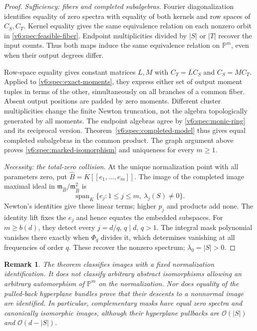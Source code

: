 \documentclass[10pt,fleqn]{article}
\numberwithin{equation}{section}
\newtheorem{remark}[theorem]{Remark}
\newcommand{\PP}{\mathbb P}
\newcommand{\Span}{\operatorname{span}}
\begin{document}
\begin{proof}
\emph{Sufficiency: fibers and completed subalgebras.}
Fourier diagonalization identifies equality of zero spectra with equality
of both kernels and row spaces of $C_S,C_T$.  Kernel equality gives
the same equivalence relation on each nonzero orbit in
\eqref{v6:spec:feasible-fiber}.  Endpoint multiplicities divided by $|S|$ or $|T|$ recover the input
counts.  Thus both maps induce the same equivalence relation on
$\PP^m$, even when their output degrees differ.

Row-space equality gives constant matrices $L,M$ with $C_T=LC_S$
and $C_S=MC_T$.  Applied to \eqref{v6:spec:exact-moments}, they
express either set of output moment tuples in terms of the other, simultaneously
on all branches of a common fiber.  Absent output positions are padded
by zero moments.  Different cluster multiplicities change the finite
Newton truncation, not the algebra topologically generated by all moments.
The endpoint algebras agree by \eqref{v6:spec:monic-ring} and its reciprocal version.
Theorem~\ref{v6:spec:completed-model} thus gives equal completed
subalgebras in the common product.  The graph argument above proves
\eqref{v6:spec:marked-isomorphism} and uniqueness for every $m\ge1$.

\emph{Necessity: the total-zero collision.}
At the unique normalization point with all parameters zero, put
$\widehat B=K[[e_1,\ldots,e_m]]$.  The image of the completed
image maximal ideal in $\mathfrak m_{\widehat B}/\mathfrak m_{\widehat B}^2$ is
\begin{equation}\label{v6:spec:homogeneous-cotangent}
 \Span_K\{e_j:1\le j\le m,\ \lambda_j(S)\ne0\}.
\end{equation}
Newton's identities give these linear terms; higher $p_j$ and
products add none.  The identity lift fixes the $e_j$ and hence
equates the embedded subspaces.
For $m\ge b(d)$, they detect every $j=d/q$, $q\mid d$, $q>1$.
The integral mask polynomial vanishes there exactly when $\Phi_q$
divides it, which determines vanishing at all frequencies of order $q$.
These recover the nonzero spectrum; $\lambda_0=|S|>0$.
\end{proof}

\begin{remark}\label{v6:spec:classification-scope}
The theorem classifies images with a fixed normalization identification.
It does not classify arbitrary abstract isomorphisms allowing an arbitrary
automorphism of $\PP^m$ on the normalization.  Nor does equality of the
pulled-back hyperplane bundles prove that their descents to a nonnormal
image are identified.  In particular, complementary masks have equal zero
spectra and canonically isomorphic images, although their hyperplane
pullbacks are $\mathcal O(|S|)$ and $\mathcal O(d-|S|)$.
\end{remark}
\end{document}
